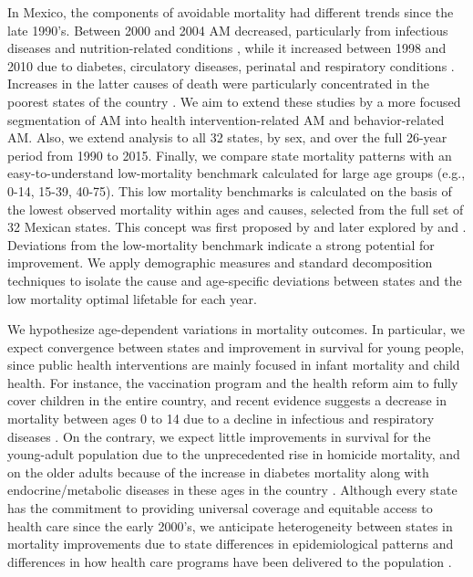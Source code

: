 \documentclass[11.5pt]{article}
\begin{document}
\begin{spacing}{1.5}
 In Mexico, the components of avoidable mortality had different trends since the
late 1990's. Between 2000 and 2004 AM decreased, particularly from
infectious diseases and nutrition-related conditions \citep{francomarina2006}, while it increased between 1998 and 2010 due to diabetes, circulatory diseases, perinatal and respiratory conditions
\citep{agudelo2014efecto}. Increases in the latter causes
of death were particularly concentrated in the poorest states of the country
\citep{davila2014mortalidad}. We aim to extend these studies
by a more focused segmentation of AM into health intervention-related AM and
behavior-related AM. Also, we extend analysis to all 32 states, by sex, and over
the full 26-year period from 1990 to 2015. Finally, we compare state mortality patterns
with an easy-to-understand low-mortality benchmark calculated for large age groups (e.g., 0-14, 15-39, 40-75). This low mortality
benchmarks is calculated on the basis of the lowest observed mortality within
ages and causes, selected from the full set of 32 Mexican states. This concept was first
proposed by \citet{whelpton1947} and later explored by  \citet{wunsch1975minimum} and
\citet{vallin2008minimum}. Deviations from the low-mortality benchmark indicate a strong potential for improvement. We apply demographic measures and
standard decomposition techniques to isolate the cause and age-specific deviations between states and the low mortality optimal lifetable for each year.

We hypothesize age-dependent variations in mortality outcomes.
In particular, we expect convergence between states and improvement in survival
for young people, since public health interventions are mainly focused in infant
mortality and child health. For instance, the vaccination program and the health
reform aim to fully cover children in the entire country, and recent
evidence suggests a decrease in mortality between ages 0 to 14 due to a decline
in infectious and respiratory diseases \citep{canudas2014}. On the contrary, we
expect little improvements in survival for the  young-adult population due to the unprecedented rise in homicide mortality, and on the older adults because of the increase in diabetes mortality along with endocrine/metabolic diseases in these ages in the country \citep{canudas2014}. Although every
state has the commitment to providing universal coverage and equitable access to
health care since the early 2000's, we anticipate heterogeneity between states
in mortality improvements due to state differences in epidemiological patterns and differences in how  health care programs have been delivered to the population
\citep{Frenk2006}.



\end{spacing}
\end{document}
